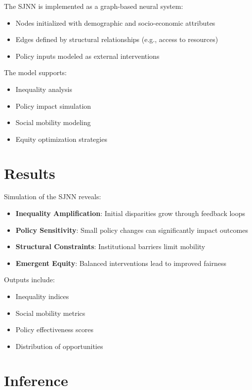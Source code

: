 \documentclass[12pt]{article}
\begin{document}
The SJNN is implemented as a graph-based neural system:

\begin{itemize}
\item Nodes initialized with demographic and socio-economic attributes
\item Edges defined by structural relationships (e.g., access to resources)
\item Policy inputs modeled as external interventions
\end{itemize}

The model supports:

\begin{itemize}
\item Inequality analysis
\item Policy impact simulation
\item Social mobility modeling
\item Equity optimization strategies
\end{itemize}

\section{Results}

Simulation of the SJNN reveals:

\begin{itemize}
\item \textbf{Inequality Amplification}: Initial disparities grow through feedback loops
\item \textbf{Policy Sensitivity}: Small policy changes can significantly impact outcomes
\item \textbf{Structural Constraints}: Institutional barriers limit mobility
\item \textbf{Emergent Equity}: Balanced interventions lead to improved fairness
\end{itemize}

Outputs include:

\begin{itemize}
\item Inequality indices
\item Social mobility metrics
\item Policy effectiveness scores
\item Distribution of opportunities
\end{itemize}

\section{Inference}
\end{document}
